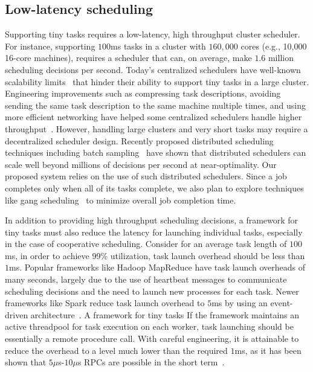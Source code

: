 
\subsection{Low-latency scheduling}
Supporting tiny tasks requires a low-latency, high throughput cluster scheduler.
For instance, supporting $100$ms tasks in a cluster with $160,000$ cores
(e.g., 10,000 16-core machines),
requires a scheduler that can, on average, make $1.6$ million scheduling
decisions per second.
Today's centralized schedulers have well-known scalability
limits~\cite{wilkesberkeley} that
hinder their ability to support tiny tasks in a large cluster.
Engineering improvements such as compressing task descriptions,
avoiding sending the same task description to the same machine multiple
times, and using more efficient networking have helped some
centralized schedulers
handle higher throughput~\cite{zaharia2012meetup}.
However, handling large clusters and very
short tasks may require a decentralized scheduler design.
Recently proposed distributed scheduling techniques including batch
sampling~\cite{ousterhoutbatch} have shown that distributed schedulers
can scale well beyond millions of decisions per second at near-optimality.
Our proposed system relies on the use of such distributed schedulers.
Since a job completes only when all of its tasks complete, we also plan to 
explore techniques like gang scheduling~\cite{feitelson1992gang} to minimize
overall job completion time.

In addition to providing high throughput scheduling decisions, a framework for
tiny tasks must also reduce the latency for launching individual tasks,
especially in the case of cooperative scheduling.
Consider for an average task length of $100$ms, in order to achieve 99\% utilization,
task launch overhead should be less than $1$ms.
Popular frameworks like Hadoop MapReduce
have task launch overheads of many seconds, largely due to the use of
heartbeat messages to communicate scheduling decisions and the need to launch new
processes for each task.
Newer frameworks like Spark reduce task launch overhead to $5$ms
by using an event-driven architecture~\cite{shark-tr}.
A framework for tiny tasks 
If the framework maintains an active threadpool for task execution on each worker,
task launching should be essentially a remote procedure call.
With careful engineering,
it is attainable to reduce the overhead to a level much lower than the
required $1$ms, as it has been shown that $5\mu$s-$10\mu$s RPCs are possible
in the short term~\cite{low-latency}.


